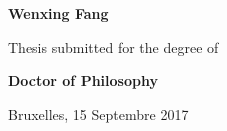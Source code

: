 \begin{titlepage}
\begin{center}
\begin{Large}
        \textbf{Wenxing Fang}
        \vspace*{1.5cm}

        Thesis submitted for the degree of
        \vspace*{0.5cm}

        \textbf{Doctor of Philosophy} \\
        \end{Large}


        \vspace{1.8cm}

        Bruxelles, 15 Septembre 2017

    \end{center}
\afterpage{\blankpage}
\end{titlepage}

\newpage


